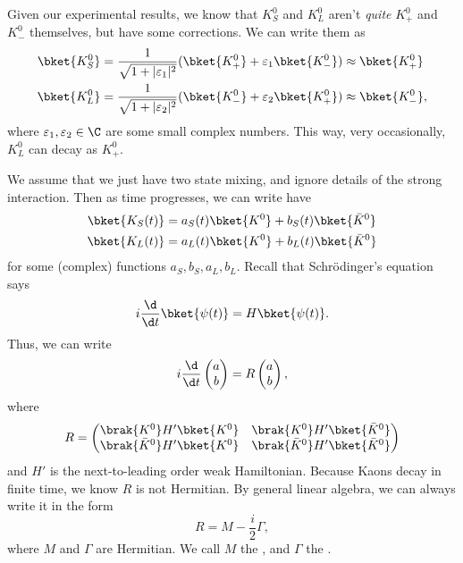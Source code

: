 \documentclass[a4paper]{article}
\begin{document}
Given our experimental results, we know that $K_S^0$ and $K_L^0$ aren't \emph{quite} $K_+^0$ and $K_-^0$ themselves, but have some corrections. We can write them as
\begin{align*}
  \bket{K_S^0} &= \frac{1}{\sqrt{1 + |\varepsilon_1|^2}} (\bket{K_+^0} + \varepsilon_1 \bket{K_-^0}) \approx \bket{K_+^0}\\
  \bket{K_L^0} &= \frac{1}{\sqrt{1 + |\varepsilon_2|^2}} (\bket{K_-^0} + \varepsilon_2 \bket{K_+^0}) \approx \bket{K_-^0},
\end{align*}
where $\varepsilon_1, \varepsilon_2 \in \C$ are some small complex numbers. This way, very occasionally, $K_L^0$ can decay as $K_+^0$.

We assume that we just have two state mixing, and ignore details of the strong interaction. Then as time progresses, we can write have
\begin{align*}
  \bket{K_S(t)} &= a_S(t) \bket{K^0} + b_S(t) \bket{\bar{K}^0}\\
  \bket{K_L(t)} &= a_L(t) \bket{K^0} + b_L(t) \bket{\bar{K}^0}
\end{align*}
for some (complex) functions $a_S, b_S, a_L, b_L$. Recall that Schr\"odinger's equation says
\[
  i \frac{\d}{\d t} \bket{\psi(t)} = H \bket{\psi(t)}.
\]
Thus, we can write
\[
  i \frac{\d}{\d t}
  \begin{pmatrix}
    a\\ b
  \end{pmatrix} =
  R
  \begin{pmatrix}
    a\\b
  \end{pmatrix},
\]
where
\[
  R =
  \begin{pmatrix}
    \brak{K^0}H' \bket{K^0} & \brak{K^0}H' \bket{\bar{K}^0}\\
    \brak{\bar{K}^0}H' \bket{K^0} & \brak{\bar{K}^0}H' \bket{\bar{K}^0}
  \end{pmatrix}
\]
and $H'$ is the next-to-leading order weak Hamiltonian. Because Kaons decay in finite time, we know $R$ is not Hermitian. By general linear algebra, we can always write it in the form
\[
  R = M - \frac{i}{2} \Gamma,
\]
where $M$ and $\Gamma$ are Hermitian. We call $M$ the , and $\Gamma$ the .
\end{document}
